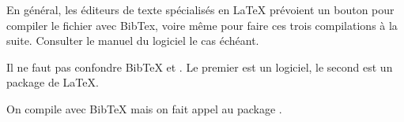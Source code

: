 En général, les éditeurs de texte spécialisés en \LaTeX{} prévoient un bouton pour compiler le fichier  avec BibTex, voire même pour faire ces trois compilations à la suite. Consulter le manuel du logiciel le cas échéant.

\begin{attention}

Il ne faut pas confondre BibTeX et . Le premier est un logiciel, le second est un package de \LaTeX{}.

On compile avec BibTeX mais on fait appel au package .

\end{attention}





